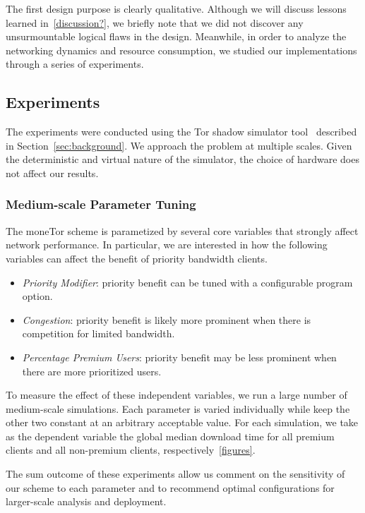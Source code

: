 The first design purpose is clearly qualitative. Although we will discuss
lessons learned in~\ref{discussion?}, we briefly note that we did not discover
any unsurmountable logical flaws in the design. Meanwhile, in order to analyze
the networking dynamics and resource consumption, we studied our implementations
through a series of experiments.

\subsection{Experiments}

The experiments were conducted using the Tor shadow simulator
tool~\cite{jansen2011shadow} described in Section~\ref{sec:background}. We
approach the problem at multiple scales. Given the deterministic and virtual
nature of the simulator, the choice of hardware does not affect our results.

\subsubsection{Medium-scale Parameter Tuning}

The moneTor scheme is parametized by several core variables that strongly affect
network performance. In particular, we are interested in how the following
variables can affect the benefit of priority bandwidth clients.

\begin{itemize}
\item \emph{Priority Modifier}: priority benefit can be tuned with a configurable
  program option.
\item \emph{Congestion}: priority benefit is likely more prominent when there is
  competition for limited bandwidth.
\item \emph{Percentage Premium Users}: priority benefit may be less prominent
  when there are more prioritized users.
\end{itemize}

To measure the effect of these independent variables, we run a large number of
medium-scale simulations. Each parameter is varied individually while keep the
other two constant at an arbitrary acceptable value. For each simulation, we
take as the dependent variable the global median download time for all premium
clients and all non-premium clients, respectively~\ref{figures}.


The sum outcome of these experiments allow us comment on the sensitivity of our
scheme to each parameter and to recommend optimal configurations for
larger-scale analysis and deployment.

